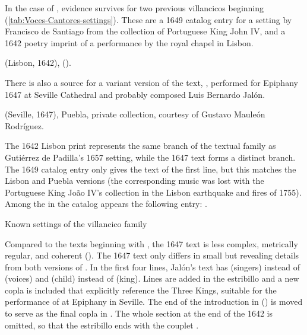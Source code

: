 In the case of , evidence survives for two
previous villancicos beginning 
(\cref{tab:Voces-Cantores-settings}).
These are a 1649 catalog entry for a setting by Francisco de Santiago from the
collection of Portuguese King John IV, and a 1642 poetry imprint of a
performance by the royal chapel in Lisbon.%
\begin{Footnote}
     (Lisbon, 1642),
     ().
\end{Footnote}
There is also a source for a variant version of the text, , performed for Epiphany 1647 at Seville Cathedral and probably composed
Luis Bernardo Jalón.%
\begin{Footnote}
     (Seville, 1647), Puebla, private
    collection, courtesy of Gustavo Mauleón Rodríguez.
\end{Footnote}
The 1642 Lisbon print represents the same branch of the textual family as
Gutiérrez de Padilla's 1657 setting, while the 1647  text
forms a distinct branch.
The 1649 catalog entry only gives the text of the first line, but this matches
the Lisbon and Puebla versions (the corresponding music was lost with the 
Portuguese King João IV's collection in the Lisbon earthquake and fires of
1755).
Among the  in the
catalog appears the following entry:
.%
    \Autocites
    [caixão 26, ]{JohnIV:Catalog}
    [see also][]{Ribeiro:JohnIV}

{Known settings of the  villancico family}

Compared to the texts beginning with , the 1647 text
 is less complex, metrically regular, and
coherent 
().
The 1647  text only differs in small but revealing details
from both versions of .
In the first four lines, Jalón's text has  (singers) instead
of  (voices) and  (child) instead of 
(king).
Lines are added in the estribillo and a new copla is included that explicitly
reference the Three Kings, suitable for the performance of  at
Epiphany in Seville.
The end of the introduction in  () is moved to serve as the final copla in .
The whole  section at the end of the 1642  is omitted,
so that the estribillo ends with the couplet .

